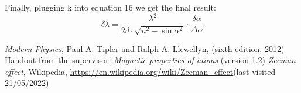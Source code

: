 \documentclass{scrartcl}
\begin{document}
Finally, plugging k into equation 16 we get the final result:
\begin{equation}
    \delta \lambda = \frac{\lambda^2}{2d\cdot \sqrt{n^2 -\sin{\alpha}^2}} \cdot \frac{\delta \alpha}{\Delta \alpha}
\end{equation}



\begin{thebibliography}{}
 \textit{Modern Physics}, Paul A. Tipler and Ralph A. Llewellyn, (sixth edition, 2012)
  Handout from the supervisor: \textit{Magnetic properties of atoms} (version 1.2)
  \textit{Zeeman effect}, Wikipedia, \url{https://en.wikipedia.org/wiki/Zeeman_effect}(last visited 21/05/2022)
\end{thebibliography}
\end{document}
